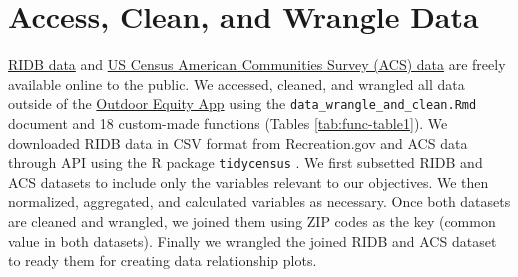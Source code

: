 \documentclass[
]{book}
\begin{document}
\hypertarget{access-clean-and-wrangle-data}{%
\section{Access, Clean, and Wrangle Data}\label{access-clean-and-wrangle-data}}

\href{https://ridb.recreation.gov/}{RIDB data} and \href{https://www.census.gov/programs-surveys/acs/data.html}{US Census American Communities Survey (ACS) data} are freely available online to the public. We accessed, cleaned, and wrangled all data outside of the \href{https://shinyapps.bren.ucsb.edu/oe_app/}{Outdoor Equity App} using the \texttt{data\_wrangle\_and\_clean.Rmd} document and 18 custom-made functions (Tables \ref{tab:func-table1}). We downloaded RIDB data in CSV format from Recreation.gov and ACS data through API using the R package \texttt{tidycensus} \citep{R-tidycensus}. We first subsetted RIDB and ACS datasets to include only the variables relevant to our objectives. We then normalized, aggregated, and calculated variables as necessary. Once both datasets are cleaned and wrangled, we joined them using ZIP codes as the key (common value in both datasets). Finally we wrangled the joined RIDB and ACS dataset to ready them for creating data relationship plots.
\end{document}
